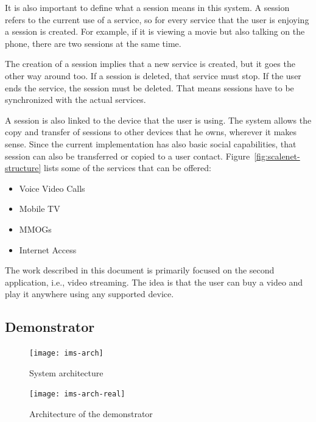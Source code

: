 It is also important to define what a session means in this system.
A session refers to the current use of a service, so for every service that the user is enjoying a session is created.
For example, if it is viewing a movie but also talking on the  phone, there are two sessions at the same time.

The creation of a session implies that a new service is created, but it goes the other way around too.
If a session is deleted, that service must stop.
If the user ends the service, the session must be deleted.
That means sessions have to be synchronized with the actual services.

A session is also linked to the device that the user is using.
The system allows the copy and transfer of sessions to other devices that he owns, wherever it makes sense.
Since the current implementation has also basic social capabilities, that session can also be transferred or copied to a user contact.
Figure~\ref{fig:scalenet-structure} lists some of the services that can be offered:

\begin{itemize}
  \item Voice \et{} Video Calls
  \item Mobile TV \et{} 
  \item {}\acp{MMOG}
  \item Internet Access
\end{itemize}

The work described in this document is primarily focused on the second application, i.e., video streaming.
The idea is that the user can buy a video and play it anywhere using any supported device.


\subsection{ Demonstrator} %
\label{sub:demonstrator}

\begin{figure}[p]
  \centering
    \texttt{[image: ims-arch]}
  \caption{System architecture}
  \label{fig:ims-arch}
\end{figure}

\begin{figure}[p]
  \centering
    \texttt{[image: ims-arch-real]}
  \caption{Architecture of the demonstrator}
  \label{fig:ims-arch-real}
\end{figure}

